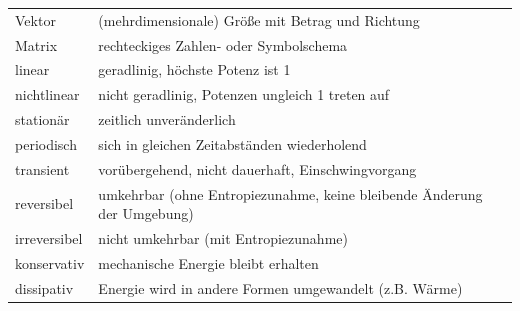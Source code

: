 \begin{center}
\begin{tabularx}{0.9\textwidth}{l X}
    Vektor & (mehrdimensionale) Größe mit Betrag und Richtung \\
    Matrix & rechteckiges Zahlen- oder Symbolschema \\
    linear & geradlinig, höchste Potenz ist 1 \\
    nichtlinear & nicht geradlinig, Potenzen ungleich 1 treten auf \\
    stationär & zeitlich unveränderlich \\
    periodisch & sich in gleichen Zeitabständen wiederholend \\
    transient & vorübergehend, nicht dauerhaft, Einschwingvorgang \\
    reversibel & umkehrbar (ohne Entropiezunahme, keine bleibende Änderung der Umgebung) \\
    irreversibel & nicht umkehrbar (mit Entropiezunahme) \\
    konservativ & mechanische Energie bleibt erhalten \\
    dissipativ & Energie wird in andere Formen umgewandelt (z.B. Wärme) \\
    \bottomrule
  \end{tabularx}
\end{center}

\newpage

